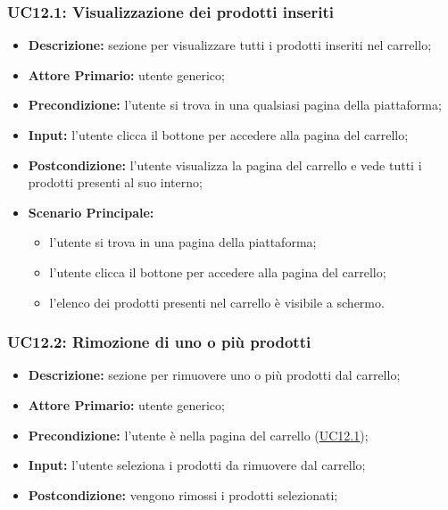 \subsubsection{UC12.1: Visualizzazione dei prodotti inseriti}
\label{sec:UC12.1}
\begin{itemize}
    \item \textbf{Descrizione:} sezione per visualizzare tutti i prodotti inseriti nel carrello;
    \item \textbf{Attore Primario:} utente generico;
    \item \textbf{Precondizione:}  l'utente si trova in una qualsiasi pagina della piattaforma;
    \item \textbf{Input:} l'utente clicca il bottone per accedere alla pagina del carrello;
    \item \textbf{Postcondizione:} l'utente visualizza la pagina del carrello e vede tutti i prodotti presenti al suo interno;
    \item \textbf{Scenario Principale:}
          \begin{itemize}
              \item l'utente si trova in una pagina della piattaforma;
              \item l'utente clicca il bottone per accedere alla pagina del carrello;
              \item l'elenco dei prodotti presenti nel carrello è visibile a schermo.
          \end{itemize}
\end{itemize}
\subsubsection{UC12.2: Rimozione di uno o più prodotti}
\label{sec:UC12.2}
\begin{itemize}
    \item \textbf{Descrizione:} sezione per rimuovere uno o più prodotti dal carrello;
    \item \textbf{Attore Primario:} utente generico;
    \item \textbf{Precondizione:} l'utente è nella pagina del carrello (\hyperref[sec:UC12.1]{\underline{UC12.1}});
    \item \textbf{Input:} l'utente seleziona i prodotti da rimuovere dal carrello;
    \item \textbf{Postcondizione:} vengono rimossi i prodotti selezionati;
\end{itemize}
